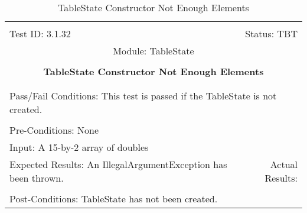 \documentclass[titlepage]{article}
\begin{document}
\begin{center}%
\begin{table}
\begin{tabular}{|l r|}\hline&\\[-2mm]
	Test ID: 3.1.32	&Status: TBT\\[-3mm]
	\multicolumn{2}{|c|}{Module: TableState}\\&\\
	\multicolumn{2}{|c|}{\textbf{\large{TableState Constructor Not Enough Elements}}}\\&\\\hline&\\[-3mm]
	\multicolumn{2}{|p{\textwidth}|}{Pass/Fail Conditions: This test is passed if the TableState is not created.}\\[1mm]\hline&\\[-3mm]
	\multicolumn{2}{|p{\textwidth}|}{Pre-Conditions: None}\\[4mm]
	\multicolumn{2}{|p{\textwidth}|}{Input: A 15-by-2 array of doubles}\\[2mm]\hline
	\multicolumn{1}{|p{0.49\textwidth}}{Expected Results: An IllegalArgumentException has been thrown.}	&\multicolumn{1}{|p{0.45\textwidth}|}{Actual Results: }\\\hline&\\[-3mm]
	\multicolumn{2}{|p{\textwidth}|}{Post-Conditions: TableState has not been created.}\\\hline
\end{tabular}
\caption{TableState Constructor Not Enough Elements}
\end{table}
\end{center}
\end{document}
